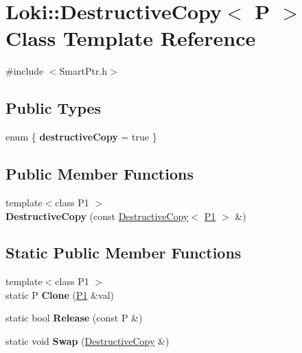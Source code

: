 \hypertarget{classLoki_1_1DestructiveCopy}{}\section{Loki\+:\+:Destructive\+Copy$<$ P $>$ Class Template Reference}
\label{classLoki_1_1DestructiveCopy}


{\ttfamily \#include $<$Smart\+Ptr.\+h$>$}

\subsection*{Public Types}
\begin{DoxyCompactItemize}
\item 
\hypertarget{classLoki_1_1DestructiveCopy_acbab9dc826ff0d2b44173803bbf5e40c}{}enum \{ {\bfseries destructive\+Copy} = true
 \}\label{classLoki_1_1DestructiveCopy_acbab9dc826ff0d2b44173803bbf5e40c}

\end{DoxyCompactItemize}
\subsection*{Public Member Functions}
\begin{DoxyCompactItemize}
\item 
\hypertarget{classLoki_1_1DestructiveCopy_a3d4357f54572dd5e900b3365d9810c2a}{}{\footnotesize template$<$class P1 $>$ }\\{\bfseries Destructive\+Copy} (const \hyperlink{classLoki_1_1DestructiveCopy}{Destructive\+Copy}$<$ \hyperlink{structP1}{P1} $>$ \&)\label{classLoki_1_1DestructiveCopy_a3d4357f54572dd5e900b3365d9810c2a}

\end{DoxyCompactItemize}
\subsection*{Static Public Member Functions}
\begin{DoxyCompactItemize}
\item 
\hypertarget{classLoki_1_1DestructiveCopy_abcd1ed183ddc3a16747b81155d2f0652}{}{\footnotesize template$<$class P1 $>$ }\\static P {\bfseries Clone} (\hyperlink{structP1}{P1} \&val)\label{classLoki_1_1DestructiveCopy_abcd1ed183ddc3a16747b81155d2f0652}

\item 
\hypertarget{classLoki_1_1DestructiveCopy_aca9a3258cbc6a569e4130f6a43592c54}{}static bool {\bfseries Release} (const P \&)\label{classLoki_1_1DestructiveCopy_aca9a3258cbc6a569e4130f6a43592c54}

\item 
\hypertarget{classLoki_1_1DestructiveCopy_ac23be6f4931a3ca83a3beb42d05ee97a}{}static void {\bfseries Swap} (\hyperlink{classLoki_1_1DestructiveCopy}{Destructive\+Copy} \&)\label{classLoki_1_1DestructiveCopy_ac23be6f4931a3ca83a3beb42d05ee97a}

\end{DoxyCompactItemize}


